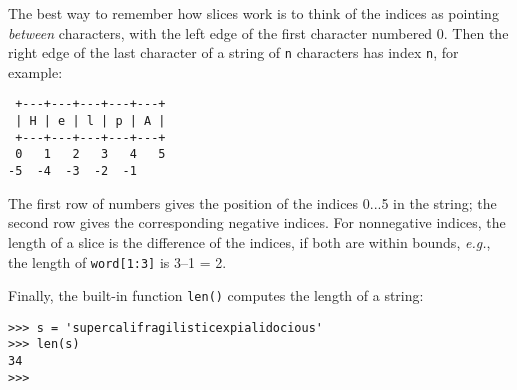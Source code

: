 The best way to remember how slices work is to think of the indices as
pointing
{\it between}
characters, with the left edge of the first character numbered 0.
Then the right edge of the last character of a string of
{\tt n}
characters has index
{\tt n},
for example:
\begin{code}\begin{verbatim}
 +---+---+---+---+---+ 
 | H | e | l | p | A |
 +---+---+---+---+---+ 
 0   1   2   3   4   5 
-5  -4  -3  -2  -1
\end{verbatim}\end{code}
The first row of numbers gives the position of the indices 0...5 in the
string; the second row gives the corresponding negative indices.
For nonnegative indices, the length of a slice is the difference of the
indices, if both are within bounds,
{\it e.g.},
the length of
{\tt word[1:3]}
is 3--1 = 2.

Finally, the built-in function {\tt len()} computes the length of a
string:
\begin{code}\begin{verbatim}
>>> s = 'supercalifragilisticexpialidocious'
>>> len(s)
34
>>> 
\end{verbatim}\end{code}

